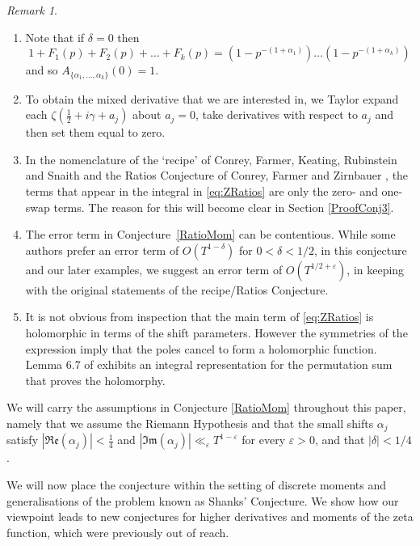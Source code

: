 \documentclass[12pt,a4paper,reqno]{amsart}
\theoremstyle{remark}
\newtheorem*{remark}{Remark}
\numberwithin{equation}{section}
\renewcommand{\Re}{\mathfrak{Re}}
\renewcommand{\Im}{\mathfrak{Im}}
\begin{document}
\begin{remark}\hfill
\begin{enumerate}
    \item Note that if $\delta=0$ then
    \[
    1 + F_1(p) + F_2(p) + \dots + F_k(p) = (1-p^{-(1+\alpha_1)})\dots(1-p^{-(1+\alpha_k)})
    \]
    and so $A_{\{\alpha_1,\dots,\alpha_k\}}(0) =1$.

    \item To obtain the mixed derivative that we are interested in, we Taylor expand each $\zeta (\frac{1}{2} + i \gamma + a_j)$ about $a_j=0$, take derivatives with respect to $a_j$ and then set them equal to zero.

    \item In the nomenclature of the `recipe' of Conrey, Farmer, Keating, Rubinstein and Snaith \cite{CFKRS05} and the Ratios Conjecture of Conrey, Farmer and Zirnbauer \cite{CFZ05}, the terms that appear in the integral in \eqref{eq:ZRatios} are only the zero- and one-swap terms. The reason for this will become clear in Section \ref{ProofConj3}.

    \item The error term in Conjecture~\ref{RatioMom} can be contentious. While some authors prefer an error term of $O\left(T^{1 - \delta}\right)$ for $0 < \delta < 1/2$, in this conjecture and our later examples, we suggest an error term of $O\left(T^{1/2 +\varepsilon}\right)$, in keeping with the original statements of the recipe/Ratios Conjecture.

    \item It is not obvious from inspection that the main term of \eqref{eq:ZRatios} is holomorphic in terms of the shift parameters. However the symmetries of the expression imply that the poles cancel to form a holomorphic function. Lemma 6.7 of \cite{CFZ07} exhibits an integral representation for the permutation sum that proves the holomorphy.
\end{enumerate}
\end{remark}

We will carry the assumptions in Conjecture \ref{RatioMom} throughout this paper, namely that we assume the Riemann Hypothesis and that the small shifts $\alpha_j$ satisfy $|\Re(\alpha_j)| < \frac{1}{4}$ and $|\Im(\alpha_j)| \ll_\varepsilon T^{1-\varepsilon}$ for every $\varepsilon > 0$, and that  $|\delta|<1/4$.


We will now place the conjecture within the setting of discrete moments and generalisations of the problem known as Shanks' Conjecture. We show how our viewpoint leads to new conjectures for higher derivatives and moments of the zeta function, which were previously out of reach.
\end{document}
